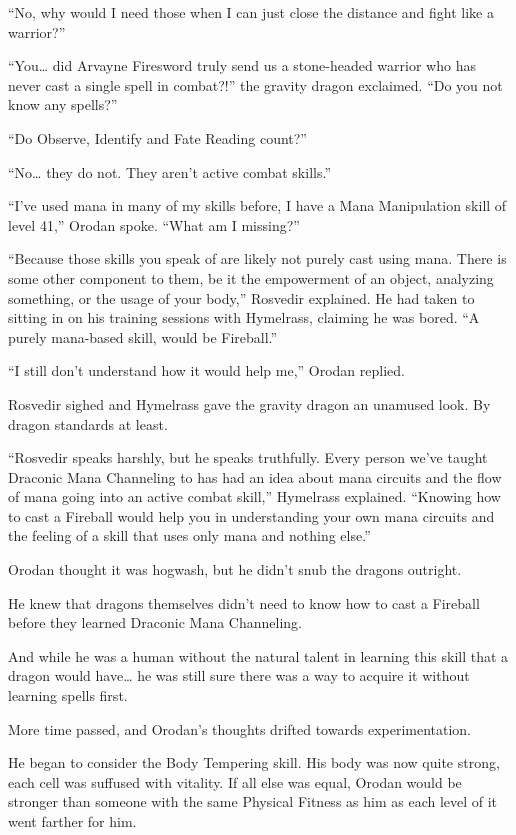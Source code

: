 \documentclass[a4paper,10pt]{book}
\begin{document}
“No, why would I need those when I can just close the distance and fight like a warrior?”\par
“You… did Arvayne Firesword truly send us a stone-headed warrior who has never cast a single spell in combat?!” the gravity dragon exclaimed. “Do you not know any spells?”\par
“Do Observe, Identify and Fate Reading count?”\par
“No… they do not. They aren’t active combat skills.”\par
“I’ve used mana in many of my skills before, I have a Mana Manipulation skill of level 41,” Orodan spoke. “What am I missing?”\par
“Because those skills you speak of are likely not purely cast using mana. There is some other component to them, be it the empowerment of an object, analyzing something, or the usage of your body,” Rosvedir explained. He had taken to sitting in on his training sessions with Hymelrass, claiming he was bored. “A purely mana-based skill, would be Fireball.”\par
“I still don’t understand how it would help me,” Orodan replied.\par
Rosvedir sighed and Hymelrass gave the gravity dragon an unamused look. By dragon standards at least.\par
“Rosvedir speaks harshly, but he speaks truthfully. Every person we’ve taught Draconic Mana Channeling to has had an idea about mana circuits and the flow of mana going into an active combat skill,” Hymelrass explained. “Knowing how to cast a Fireball would help you in understanding your own mana circuits and the feeling of a skill that uses only mana and nothing else.”\par
Orodan thought it was hogwash, but he didn’t snub the dragons outright.\par
He knew that dragons themselves didn’t need to know how to cast a Fireball before they learned Draconic Mana Channeling.\par
And while he was a human without the natural talent in learning this skill that a dragon would have… he was still sure there was a way to acquire it without learning spells first.\par
More time passed, and Orodan’s thoughts drifted towards experimentation.\par
He began to consider the Body Tempering skill. His body was now quite strong, each cell was suffused with vitality. If all else was equal, Orodan would be stronger than someone with the same Physical Fitness as him as each level of it went farther for him.\par
\end{document}
